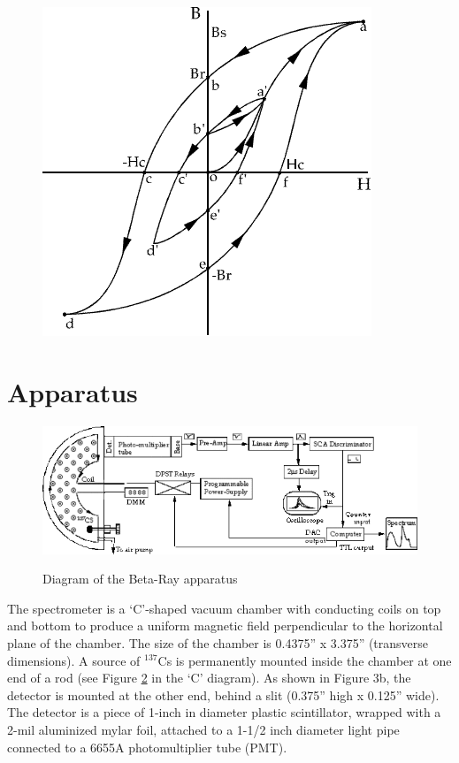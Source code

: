 \documentclass{../lab}
\begin{document}
\begin{figure}[h]
    \centering
    \href{http://experimentationlab.berkeley.edu/sites/default/files/images/BRAimage026.gif}{\includegraphics[width=0.5\linewidth]{images/BRAimage026.png}}
    \caption{}
    \label{fig:BRAimage026}
\end{figure}

\section{Apparatus}

\begin{figure}[h]
    \centering
    \href{http://experimentationlab.berkeley.edu/sites/default/files/images/600px-BRAimage010.gif}{\includegraphics[width=0.5\linewidth]{images/600px-BRAimage010.png}}
    \caption{Diagram of the Beta-Ray apparatus}
    \label{fig:DiagramOfBetaRayApparatus}
\end{figure}

The spectrometer is a `C'-shaped vacuum chamber with conducting coils on top and bottom to produce a uniform magnetic field perpendicular to the horizontal plane of the chamber. The size of the chamber is 0.4375'' x 3.375'' (transverse dimensions). A source of $^{137}$Cs is permanently mounted inside the chamber at one end of a rod (see Figure \ref{fig:DiagramOfBetaRayApparatus} in the `C' diagram). As shown in Figure 3b, the detector is mounted at the other end, behind a slit (0.375'' high x 0.125'' wide). The detector is a piece of 1-inch in diameter plastic scintillator, wrapped with a 2-mil aluminized mylar foil, attached to a 1-1/2 inch diameter light pipe connected to a 6655A photomultiplier tube (PMT).
\end{document}
